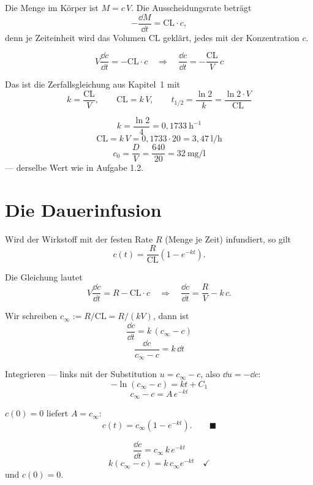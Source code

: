 \begin{merksatz}
Die Menge im Körper ist $M = c\,V$. Die Ausscheidungsrate beträgt
\[ -\frac{\dd M}{\dd t} = \mathrm{CL}\cdot c , \]
denn je Zeiteinheit wird das Volumen $\mathrm{CL}$ geklärt, jedes mit der Konzentration $c$.

\[ V\frac{\dd c}{\dd t} = -\mathrm{CL}\cdot c \quad\Longrightarrow\quad \frac{\dd c}{\dd t} = -\frac{\mathrm{CL}}{V}\,c \]

Das ist die Zerfallsgleichung aus Kapitel~1 mit
\[ \boxed{\;k = \frac{\mathrm{CL}}{V}, \qquad \mathrm{CL} = k\,V, \qquad t_{1/2} = \frac{\ln 2}{k} = \frac{\ln 2 \cdot V}{\mathrm{CL}}\;} \]

\begin{center}
\begin{minipage}{0.88\textwidth}
\end{minipage}
\end{center}

\[ k = \frac{\ln 2}{4} = 0{,}1733\ \mathrm{h}^{-1} \]
\[ \mathrm{CL} = k\,V = 0{,}1733 \cdot 20 = 3{,}47\ \mathrm{l/h} \]
\[ c_0 = \frac{D}{V} = \frac{640}{20} = 32\ \mathrm{mg/l} \]
--- derselbe Wert wie in Aufgabe 1.2. \checkmark
\end{merksatz}

\section{Die Dauerinfusion}

\begin{merksatz}
Wird der Wirkstoff mit der festen Rate $R$ (Menge je Zeit) infundiert, so gilt
\[ c(t) = \frac{R}{\mathrm{CL}}\left(1 - e^{-kt}\right) . \]

Die Gleichung lautet
\[ V\frac{\dd c}{\dd t} = R - \mathrm{CL}\cdot c \quad\Longrightarrow\quad \frac{\dd c}{\dd t} = \frac{R}{V} - k\,c . \]

 Wir schreiben $c_\infty := R/\mathrm{CL} = R/(kV)$, dann ist
\[ \frac{\dd c}{\dd t} = k\,(c_\infty - c) \]
\[ \frac{\dd c}{c_\infty - c} = k\,\dd t \]

Integrieren --- links mit der Substitution $u = c_\infty - c$, also $\dd u = -\dd c$:
\[ -\ln(c_\infty - c) = kt + C_1 \]
\[ c_\infty - c = A\,e^{-kt} \]

 $c(0) = 0$ liefert $A = c_\infty$:
\[ c(t) = c_\infty\left(1 - e^{-kt}\right) . \qquad \blacksquare \]

\[ \frac{\dd c}{\dd t} = c_\infty\,k\,e^{-kt} \]
\[ k(c_\infty - c) = k\,c_\infty e^{-kt} \quad \checkmark \]
und $c(0) = 0$. \checkmark
\end{merksatz}

